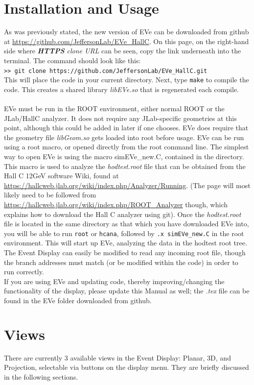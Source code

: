 \documentclass[12pt]{article}
\numberwithin{equation}{section}
\begin{document}
\section{Installation and Usage}
As was previously stated, the new version of EVe can be downloaded from github at \url{https://github.com/JeffersonLab/EVe\_HallC}. On this page, on the right-hand side where \textit{\textbf{HTTPS} clone URL} can be seen, copy the link underneath into the terminal. The command should look like this:
\\
\texttt{>> git clone https://github.com/JeffersonLab/EVe\_HallC.git }
\\
This will place the code in your current directory. Next, type \texttt{make} to compile the code. This creates a shared library \textit{libEVe.so} that is regenerated each compile. 
\\
\\
EVe must be run in the ROOT environment, either normal ROOT or the JLab/HallC analyzer. It does not require any JLab-specific geometries at this point, although this could be added in later if one chooses. EVe does require that the geometry file \textit{libGeom.so} gets loaded into root before usage. EVe can be run using a root macro, or opened directly from the root command line. The simplest way to open EVe is using the macro simEVe\_new.C, contained in the directory. This macro is used to analyze the \textit{hodtest.root} file that can be obtained from the Hall C 12GeV software Wiki, found at \url{https://hallcweb.jlab.org/wiki/index.php/Analyzer/Running}. (The page will most likely need to be followed from \url{https://hallcweb.jlab.org/wiki/index.php/ROOT\_Analyzer} though, which explains how to download the Hall C analyzer using git). Once the \textit{hodtest.root} file is located in the same directory as that which you have downloaded EVe into, you will be able to run \texttt{root} or \texttt{hcana}, followed by \texttt{.x simEVe\_new.C} in the root environment. This will start up EVe, analyzing the data in the hodtest root tree. The Event Display can easily be modified to read any incoming root file, though the branch addresses must match (or be modified within the code) in order to run correctly.
\\
If you are using EVe and updating code, thereby improving/changing the functionality of the display, please update this Manual as well; the \textit{.tex} file can be found in the EVe folder downloaded from github.

\section{Views}
There are currently 3 available views in the Event Display: Planar, 3D, and Projection, selectable via buttons on the display menu. They are briefly discussed in the following sections.
\end{document}
